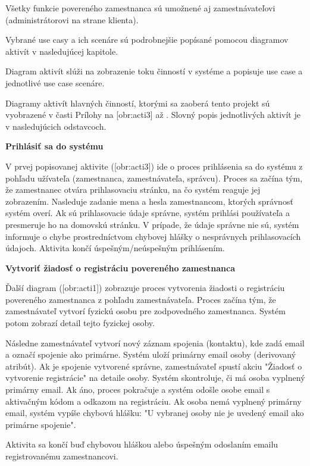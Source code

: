 Všetky funkcie povereného zamestnanca sú umožnené aj zamestnávateľovi (administrátorovi na strane klienta).

Vybrané use casy a ich scenáre sú podrobnejšie popísané pomocou diagramov aktivít v nasledujúcej kapitole.


Diagram aktivít slúži na zobrazenie toku činností v systéme a popisuje use case a jednotlivé use case scenáre.

Diagramy aktivít hlavných činností, ktorými sa zaoberá tento projekt sú vyobrazené v časti Prílohy na [obr:acti3] až . Slovný popis jednotlivých aktivít je v nasledujúcich odstavcoch.

\blank
\start
\setupindenting[no]
\start \bf Prihlásiť sa do systému\stop
\stop

V prvej popisovanej aktivite ([obr:acti3]) ide o proces prihlásenia sa do systému z pohľadu užívateľa (zamestnanca, zamestnávateľa, správcu). Proces sa začína tým, že zamestnanec otvára prihlasovaciu stránku, na čo systém reaguje jej zobrazením. Nasleduje zadanie mena a hesla zamestnancom, ktorých správnosť systém overí. Ak sú prihlasovacie údaje správne, systém prihlási používateľa a presmeruje ho na domovskú stránku. V prípade, že údaje správne nie sú, systém informuje o chybe prostredníctvom chybovej hlášky o nesprávnych prihlasovacích údajoch. Aktivita končí úspešným/neúspešným prihlásením.


\blank
\start
\setupindenting[no]
\start\bf Vytvoriť žiadosť o registráciu povereného zamestnanca\stop
\stop

Ďalší diagram ([obr:acti1]) zobrazuje proces vytvorenia žiadosti o registráciu povereného zamestnanca z pohľadu zamestnávateľa. Proces začína tým, že zamestnávateľ vytvorí fyzickú osobu pre zodpovedného zamestnanca. Systém potom zobrazí detail tejto fyzickej osoby. 

Následne zamestnávateľ vytvorí nový záznam spojenia (kontaktu), kde zadá email a označí spojenie ako primárne. Systém uloží primárny email osoby (derivovaný atribút). Ak je spojenie vytvorené správne, zamestnávateľ spustí akciu "Žiadosť o vytvorenie registrácie" na detaile osoby. Systém skontroluje, či má osoba vyplnený primárny email. Ak áno, proces pokračuje a systém odošle osobe email s aktivačným kódom a odkazom na registráciu. Ak osoba nemá vyplnený primárny email, systém vypíše chybovú hlášku: "U vybranej osoby nie je uvedený email ako primárne spojenie".

Aktivita sa končí buď chybovou hláškou alebo úspešným odoslaním emailu registrovanému zamestnancovi.

